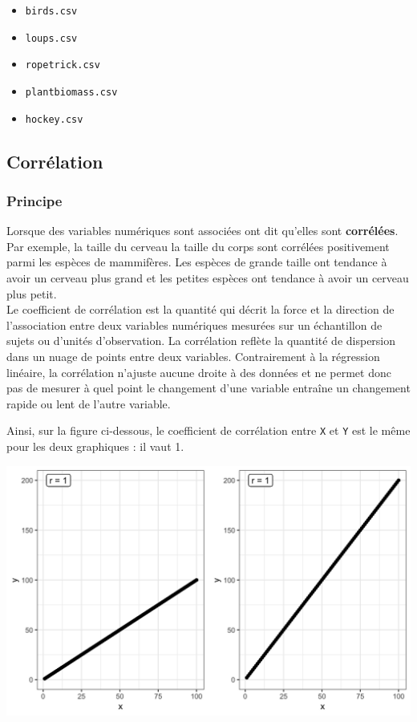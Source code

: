 \documentclass[a4paperpaper,]{article}
\providecommand{\tightlist}{%
  \setlength{\itemsep}{0pt}\setlength{\parskip}{0pt}}
\begin{document}
\begin{itemize}
\tightlist
\item
  \texttt{birds.csv}
\item
  \texttt{loups.csv}
\item
  \texttt{ropetrick.csv}
\item
  \texttt{plantbiomass.csv}
\item
  \texttt{hockey.csv}
\end{itemize}

\hypertarget{correlation}{%
\subsection{Corrélation}\label{correlation}}

\hypertarget{principe}{%
\subsubsection{Principe}\label{principe}}

Lorsque des variables numériques sont associées ont dit qu'elles sont \textbf{corrélées}. Par exemple, la taille du cerveau la taille du corps sont corrélées positivement parmi les espèces de mammifères. Les espèces de grande taille ont tendance à avoir un cerveau plus grand et les petites espèces ont tendance à avoir un cerveau plus petit.\\
Le coefficient de corrélation est la quantité qui décrit la force et la direction de l'association entre deux variables numériques mesurées sur un échantillon de sujets ou d'unités d'observation. La corrélation reflète la quantité de dispersion dans un nuage de points entre deux variables. Contrairement à la régression linéaire, la corrélation n'ajuste aucune droite à des données et ne permet donc pas de mesurer à quel point le changement d'une variable entraîne un changement rapide ou lent de l'autre variable.

Ainsi, sur la figure ci-dessous, le coefficient de corrélation entre \texttt{X} et \texttt{Y} est le même pour les deux graphiques : il vaut 1.

\begin{center}\includegraphics[width=0.9\linewidth]{figure/unnamed-chunk-95-1} \end{center}
\end{document}
